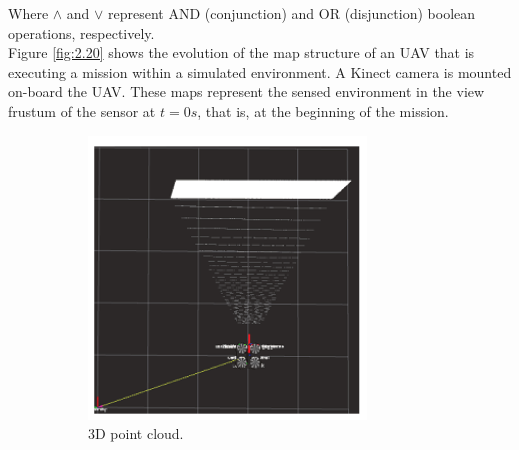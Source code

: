 Where $\wedge$ and $\vee$ represent AND (conjunction) and OR (disjunction) boolean operations, respectively.\\
Figure \ref{fig:2.20} shows the evolution of the map structure of an UAV that is executing a mission within a simulated environment. A Kinect camera is mounted on-board the UAV. These maps represent the sensed environment in the view frustum of the sensor at $t = 0s$, that is, at the beginning of the mission.
\begin{figure}[H]
    \centering
    \begin{subfigure}[t]{0.3\linewidth}
        \centering
        \includegraphics[width=\linewidth]{assets/2_20_a.png}
        \caption{{3D point cloud.}}
        \label{fig:2.20a}
    \end{subfigure}
    \begin{subfigure}[t]{0.3\linewidth}
        \centering

\end{subfigure}
\end{figure}
